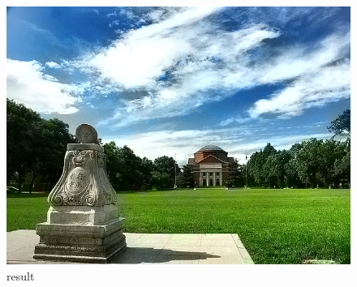 \documentclass{article}
\begin{document}
\begin{figure}[H]
{\begin{minipage}[t]{0.3\linewidth}
\includegraphics[width=\linewidth]{result_31.png}
\caption{result}
\end{minipage}
}%
\centering
\end{figure}
\end{document}
